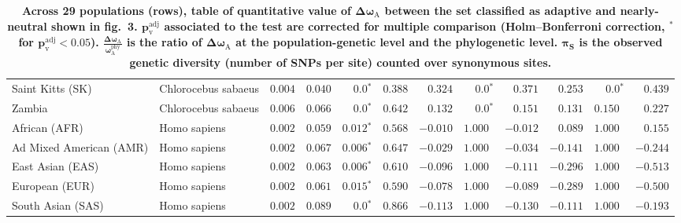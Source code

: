 \documentclass[11pt]{article}
\begin{document}
\begin{table*}[tb]
\begin{tabular}{||l|l|r||r|r|r||r|r|r||r|r|r||}
            \rowcolor{LIGHTGREY} Saint Kitts (SK)               & Chlorocebus sabaeus & $ 0.004$ & $ 0.040$ & $\bm{0.0{^*}}$                  & $ 0.388$                                                                     & $ 0.324$ & $\bm{0.0{^*}}$ & $ 0.371$ & $ 0.253$ & $\bm{0.0{^*}}$ & $ 0.439$ \\
            \rowcolor{LIGHTGREY} Zambia                         & Chlorocebus sabaeus & $ 0.006$ & $ 0.066$ & $\bm{0.0{^*}}$                  & $ 0.642$                                                                     & $ 0.132$                      & $\bm{0.0{^*}}$ & $ 0.151$ & $ 0.131$ & $ 0.150~~$ & $ 0.227$ \\
            African (AFR)                                       & Homo sapiens        & $ 0.002$ & $ 0.059$ & $\bm{ 0.012{^*}}$ & $ 0.568$ & $-0.010$ & $ 1.000~~$ & $-0.012$ & $ 0.089$ & $ 1.000~~$ & $ 0.155$ \\
            Ad Mixed American (AMR)                             & Homo sapiens        & $ 0.002$ & $ 0.067$ & $\bm{ 0.006{^*}}$ & $ 0.647$ & $-0.029$ & $ 1.000~~$ & $-0.034$ & $-0.141$ & $ 1.000~~$ & $-0.244$ \\
            East Asian (EAS)                                    & Homo sapiens        & $ 0.002$ & $ 0.063$ & $\bm{ 0.006{^*}}$ & $ 0.610$ & $-0.096$ & $ 1.000~~$ & $-0.111$ & $-0.296$ & $ 1.000~~$ & $-0.513$ \\
            European (EUR)                                      & Homo sapiens        & $ 0.002$ & $ 0.061$ & $\bm{ 0.015{^*}}$ & $ 0.590$ & $-0.078$ & $ 1.000~~$ & $-0.089$ & $-0.289$ & $ 1.000~~$ & $-0.500$ \\
            South Asian (SAS)                                   & Homo sapiens        & $ 0.002$ & $ 0.089$ & $\bm{0.0{^*}}$    & $ 0.866$ & $-0.113$ & $ 1.000~~$ & $-0.130$ & $-0.111$ & $ 1.000~~$ & $-0.193$ \\
            \bottomrule
        \end{tabular}
        \caption{
            \textbf{
            Across 29 populations (rows), table of quantitative value of $\bm{\Delta \omega_{\mathrm{A}} }$ between the set classified as adaptive and nearly-neutral shown in fig.~3.
            $\bm{p_{\mathrm{v}}^{\mathrm{adj}} }$ associated to the test are corrected for multiple comparison (Holm–Bonferroni correction, $\bm{^*}$ for $\bm{p_{\mathrm{v}}^{\mathrm{adj}} < 0.05}$).
            $\bm{\frac{\Delta\omega_{\mathrm{A}}}{\omega_{\mathrm{A}}^{\mathrm{phy}}}}$ is the ratio of $\bm{\Delta \omega_{\mathrm{A}}}$ at the population-genetic level and the phylogenetic level.
            $\bm{\pi_{\textrm{S}}}$ is the observed genetic diversity (number of SNPs per site) counted over synonymous sites.}
        }
        \label{table:unfolded-MK}
    \end{table*}
\end{document}
